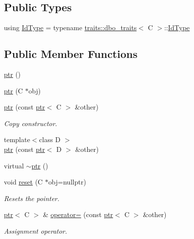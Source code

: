 \subsection*{Public Types}
\begin{DoxyCompactItemize}
\item 
using \hyperlink{classdbo_1_1ptr_a01fdb2e2c0743eb8bd1b822ccc8d4cd4}{Id\+Type} = typename \hyperlink{structdbo_1_1traits_1_1dbo__traits}{traits\+::dbo\+\_\+traits}$<$ C $>$\+::\hyperlink{classdbo_1_1ptr_a01fdb2e2c0743eb8bd1b822ccc8d4cd4}{Id\+Type}
\end{DoxyCompactItemize}
\subsection*{Public Member Functions}
\begin{DoxyCompactItemize}
\item 
\hyperlink{classdbo_1_1ptr_a3424e8d87ed87f97199e60d72d880222}{ptr} ()
\item 
\hyperlink{classdbo_1_1ptr_a2f545e2c6ac1854ea03d4701e41ea40a}{ptr} (C $\ast$obj)
\item 
\hyperlink{classdbo_1_1ptr_a1bb066cffcb5faaeec23a8e4ab2ef18e}{ptr} (const \hyperlink{classdbo_1_1ptr}{ptr}$<$ C $>$ \&other)
\begin{DoxyCompactList}\small\item\em Copy constructor. \end{DoxyCompactList}\item 
{\footnotesize template$<$class D $>$ }\\\hyperlink{classdbo_1_1ptr_adb1070e230529bd36aa1b262d68960ec}{ptr} (const \hyperlink{classdbo_1_1ptr}{ptr}$<$ D $>$ \&other)
\item 
virtual \hyperlink{classdbo_1_1ptr_ac98aace150c4d051e6bd8354210296f5}{$\sim$ptr} ()
\item 
void \hyperlink{classdbo_1_1ptr_ae4b0ee2c40996915d77d9fcdcc057fb8}{reset} (C $\ast$obj=nullptr)
\begin{DoxyCompactList}\small\item\em Resets the pointer. \end{DoxyCompactList}\item 
\hyperlink{classdbo_1_1ptr}{ptr}$<$ C $>$ \& \hyperlink{classdbo_1_1ptr_a5056e13628f91e9449dd1bd24a761a31}{operator=} (const \hyperlink{classdbo_1_1ptr}{ptr}$<$ C $>$ \&other)
\begin{DoxyCompactList}\small\item\em Assignment operator. \end{DoxyCompactList}\item 

\end{DoxyCompactItemize}
